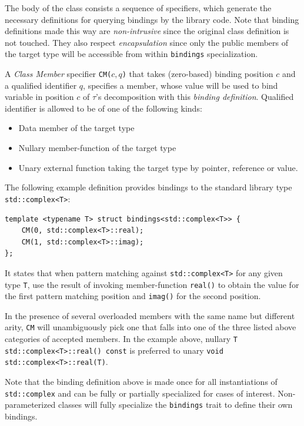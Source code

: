 \documentclass[preprint]{sigplanconf}
\makeatletter
\DeclareRobustCommand{\code}[1]{{\lstinline[breaklines=false,escapechar=@]{#1}}}
\makeatother
\begin{document}
\noindent
The body of the class consists a sequence of specifiers, which generate the 
necessary definitions for querying bindings by the library code. Note that 
binding definitions made this way are \emph{non-intrusive} since the original 
class definition is not touched. They also respect \emph{encapsulation} since 
only the public members of the target type will be accessible from within 
\code{bindings} specialization.

A \emph{Class Member} specifier \code{CM(}$c,q$\code{)} that takes (zero-based) binding 
position $c$ and a qualified identifier $q$, specifies a member, whose value will 
be used to bind variable in position $c$ of $\tau$'s decomposition with this 
\emph{binding definition}. Qualified identifier is allowed to be of one of the 
following kinds:

\begin{itemize}
\setlength{\itemsep}{0pt}
\setlength{\parskip}{0pt}
\item Data member of the target type
\item Nullary member-function of the target type
\item Unary external function taking the target type by pointer, reference or value.
\end{itemize}

\noindent
The following example definition provides bindings to the standard library type 
\code{std::complex<T>}:

\begin{lstlisting}[keepspaces,columns=flexible]
template <typename T> struct bindings<std::complex<T>> {
    CM(0, std::complex<T>::real); 
    CM(1, std::complex<T>::imag); 
};
\end{lstlisting}

\noindent
It states that when pattern matching against \code{std::complex<T>} for any 
given type \code{T}, use the result of invoking member-function \code{real()} to 
obtain the value for the first pattern matching position and \code{imag()} for 
the second position. 

In the presence of several overloaded members with the same name but different 
arity, \code{CM} will unambiguously pick one that falls into one of the three 
listed above categories of accepted members. In the example above, nullary 
\code{T std::complex<T>::real() const} is preferred to unary 
\code{void std::complex<T>::real(T)}.

Note that the binding definition above is made once for all instantiations of 
\code{std::complex} and can be fully or partially specialized for cases of 
interest. Non-parameterized classes will fully specialize the \code{bindings} 
trait to define their own bindings.
\end{document}

